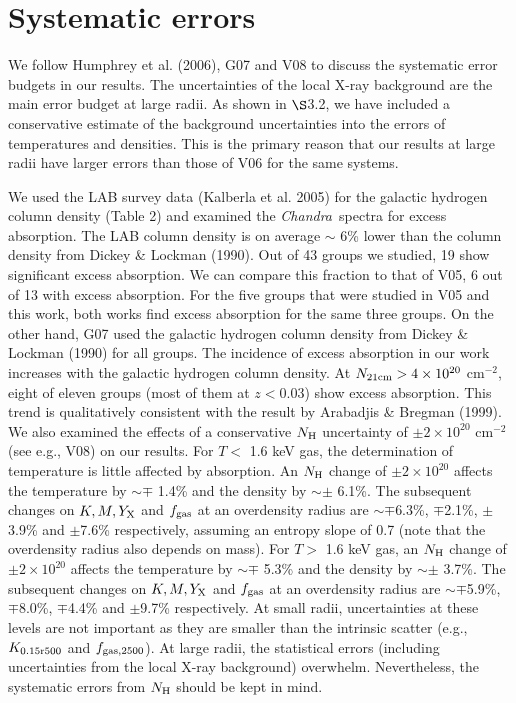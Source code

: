 \documentclass{aastex}
\def\chandra    {{\em Chandra}\/}
\begin{document}
\section{Systematic errors}

We follow Humphrey et al. (2006), G07 and V08 to discuss the systematic error
budgets in our results. The uncertainties of the local X-ray background are the
main error budget at large radii. As shown in $\S$3.2, we have included a
conservative estimate of the background uncertainties into the errors of
temperatures and densities. This is the primary reason that our results
at large radii have larger errors than those of V06 for the same systems.

We used the LAB survey data (Kalberla et al. 2005) for the galactic hydrogen
column density (Table 2) and examined the \chandra\ spectra for excess absorption.
The LAB column density is on average $\sim$ 6\% lower than the column density
from Dickey \& Lockman (1990). Out of 43 groups we studied, 19 show significant
excess absorption. We can compare this fraction to that of V05, 6 out of 13 with
excess absorption. For the five groups that were studied in V05 and this
work, both works find excess absorption for the same three groups.
On the other hand, G07 used the galactic hydrogen column density from Dickey \& Lockman
(1990) for all groups.
The incidence of excess absorption in our work increases with the galactic hydrogen
column density. At $N_{\rm 21 cm} > 4\times10^{20}$ cm$^{-2}$, eight of eleven
groups (most of them at $z < 0.03$) show excess absorption. This trend is
qualitatively consistent with the result by Arabadjis \& Bregman (1999).
We also examined the effects of a conservative $N_{\rm H}$ uncertainty of $\pm2\times10^{20}$
cm$^{-2}$ (see e.g., V08) on our results.
For $T <$ 1.6 keV gas, the determination of temperature is little affected by  
absorption. An $N_{\rm H}$ change of $\pm2\times10^{20}$ affects the temperature
by $\sim \mp$ 1.4\% and the density by $\sim \pm$ 6.1\%. The subsequent changes
on $K, M, Y_{\rm X}$ and $f_{\rm gas}$ at an overdensity radius are $\sim \mp$6.3\%,
$\mp$2.1\%, $\pm$3.9\% and $\pm$7.6\% respectively, assuming an entropy slope
of 0.7 (note that the overdensity radius also depends on mass).
For $T >$ 1.6 keV gas, an $N_{\rm H}$ change of $\pm2\times10^{20}$ affects the
temperature by $\sim \mp$ 5.3\% and the density by $\sim \pm$ 3.7\%.
The subsequent changes
on $K, M, Y_{\rm X}$ and $f_{\rm gas}$ at an overdensity radius are $\sim \mp$5.9\%,
$\mp$8.0\%, $\mp$4.4\% and $\pm$9.7\% respectively.
At small radii, uncertainties at these levels are not important as they are
smaller than the intrinsic scatter (e.g., $K_{\rm 0.15 r500}$ and $f_{\rm gas, 2500}$).
At large radii, the statistical errors (including uncertainties from the local X-ray
background) overwhelm. Nevertheless, the systematic errors from $N_{\rm H}$ should
be kept in mind.
\end{document}
